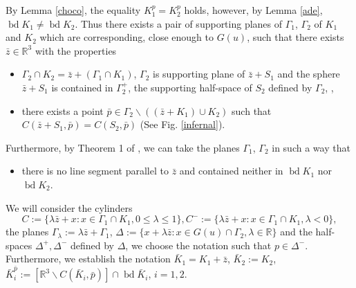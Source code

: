 \documentclass[12pt]{amsart}
\newcommand{\R}{\mathbb{R}}
\newcommand{\Rt}{\mathbb{R}^3}
\newcommand{\bd}{\operatorname*{bd}}
\begin{document}
By Lemma \ref{choco}, the equality $K_1^p=K_2^p$ holds, however, by Lemma \ref{ade}, $\bd K_1\not=\bd K_2$. Thus there exists a pair of supporting planes of $\Gamma_1$, $\Gamma_2$ of $K_1$ and $K_2$ which are corresponding, close enough to $G(u)$, such that there exists $\bar{z}\in \Rt$ with the properties
\begin{itemize}
 \item [($\mathcal{A})$] $\Gamma_2 \cap K_2=\bar{z} +(\Gamma_1 \cap K_1)$, $\Gamma_2$ is supporting plane of $\bar{z}+S_1$ and the sphere $\bar{z}+S_1$ is contained in $\Gamma^+_2$, the supporting half-space of $S_2$ defined by $\Gamma_2$,  
  ,
 \item [($\mathcal{C})$] there exists a point $\bar{p}\in \Gamma_2\backslash((\bar{z}+K_1)\cup K_2)$ such that $C(\bar{z}+S_1,\bar{p})=C(S_2,\bar{p})$ (See Fig. \ref{infernal}).
\end{itemize}
Furthermore, by Theorem 1 of \cite{ewald}, we can take the planes $\Gamma_1$, $\Gamma_2$ in such a way that
\begin{itemize}
\item [($\mathcal{D}$)]
there is no line segment parallel to $\bar{z}$ and contained neither in $\bd K_1$ nor  $\bd K_2$.
\end{itemize}

We will consider the cylinders 
\[
C:=\{\lambda \bar{z}+x:x\in \Gamma_1\cap K_1, 0\leq \lambda \leq 1\},  C^-:=\{\lambda \bar{z}+x:x\in \Gamma_1\cap K_1,   \lambda <0\},
\] 
the planes $\Gamma_{\lambda} :=\lambda \bar{z}+\Gamma_1$, $\Delta:=\{ x+\lambda \bar{z}: x\in G(u)\cap \Gamma_2, \lambda \in \R\}$ and the half-spaces $\Delta^+, \Delta^-$ defined by $\Delta$, we choose the notation such that $p\in \Delta^-$. Furthermore, we establish the notation $\bar{K}_1=K_1+\bar{z}$,  $\bar{K}_2:=K_2$, 
$\bar{K}^{\bar{p}}_i:=[\Rt\backslash C(\bar{K}_i, \bar{p})]\cap \bd \bar{K}_i$, $i=1,2$.
\end{document}
